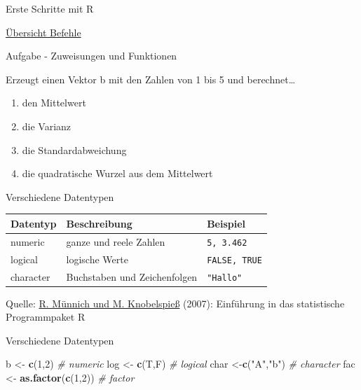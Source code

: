 \documentclass[ignorenonframetext,]{beamer}
\newenvironment{Shaded}{}{}
\newcommand{\KeywordTok}[1]{\textcolor[rgb]{0.00,0.44,0.13}{\textbf{{#1}}}}
\newcommand{\DecValTok}[1]{\textcolor[rgb]{0.25,0.63,0.44}{{#1}}}
\newcommand{\StringTok}[1]{\textcolor[rgb]{0.25,0.44,0.63}{{#1}}}
\newcommand{\CommentTok}[1]{\textcolor[rgb]{0.38,0.63,0.69}{\textit{{#1}}}}
\newcommand{\NormalTok}[1]{{#1}}
\begin{document}
\begin{frame}[fragile]{Erste Schritte mit R}
\begin{block}{\href{http://cran.r-project.org/doc/manuals/R-intro.html}{Übersicht
Befehle}}
\end{block}

\begin{block}{Aufgabe - Zuweisungen und Funktionen}

Erzeugt einen Vektor b mit den Zahlen von 1 bis 5 und berechnet\ldots{}

\begin{enumerate}
\def\labelenumi{\arabic{enumi}.}
\item
  den Mittelwert
\item
  die Varianz
\item
  die Standardabweichung
\item
  die quadratische Wurzel aus dem Mittelwert
\end{enumerate}

\end{block}

\begin{block}{Verschiedene Datentypen}

\begin{longtable}[]{@{}lll@{}}
\toprule
Datentyp & Beschreibung & Beispiel\tabularnewline
\midrule
\endhead
numeric & ganze und reele Zahlen & \texttt{5,\ 3.462}\tabularnewline
logical & logische Werte & \texttt{FALSE,\ TRUE}\tabularnewline
character & Buchstaben und Zeichenfolgen &
\texttt{"Hallo"}\tabularnewline
\bottomrule
\end{longtable}

Quelle:
\href{https://www.uni-trier.de/fileadmin/fb4/prof/VWL/FIN/Oekonometrie/PC-UEbung/Einfuehrung_in_R.pdf}{R.
Münnich und M. Knobelspieß} (2007): Einführung in das statistische
Programmpaket R

\end{block}

\begin{block}{Verschiedene Datentypen}

\begin{Shaded}
\begin{Highlighting}[]
\NormalTok{b <-}\StringTok{ }\KeywordTok{c}\NormalTok{(}\DecValTok{1}\NormalTok{,}\DecValTok{2}\NormalTok{) }\CommentTok{# numeric}
\NormalTok{log <-}\StringTok{ }\KeywordTok{c}\NormalTok{(T,F) }\CommentTok{# logical}
\NormalTok{char <-}\KeywordTok{c}\NormalTok{(}\StringTok{"A"}\NormalTok{,}\StringTok{"b"}\NormalTok{) }\CommentTok{# character}
\NormalTok{fac <-}\StringTok{ }\KeywordTok{as.factor}\NormalTok{(}\KeywordTok{c}\NormalTok{(}\DecValTok{1}\NormalTok{,}\DecValTok{2}\NormalTok{)) }\CommentTok{# factor}
\end{Highlighting}
\end{Shaded}


\end{block}
\end{frame}
\end{document}
